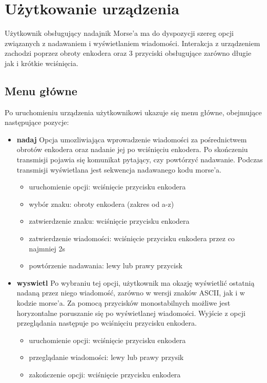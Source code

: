 \documentclass{article}
\begin{document}
\section{Użytkowanie urządzenia}
Użytkownik obsługujący nadajnik Morse'a ma do dyspozycji szereg opcji związanych z nadawaniem i wyświetlaniem wiadomości. Interakcja z urządzeniem zachodzi poprzez obroty enkodera oraz 3 przyciski obsługujące zarówno długie jak i krótkie wciśnięcia.

\subsection{Menu główne}
Po uruchomieniu urządzenia użytkownikowi ukazuje się menu główne, obejmujące następujące pozycje:

\begin{itemize}
	\item	\textbf{nadaj}\newline
Opcja umozliwiająca wprowadzenie wiadomości za pośrednictwem obrotów enkodera oraz nadanie jej po wciśnięciu enkodera. Po skończeniu transmisji pojawia się komunikat pytający, czy powtórzyć nadawanie. Podczas transmisji wyświetlana jest sekwencja nadawanego kodu morse'a.

	\begin{itemize}
	\item uruchomienie opcji: wciśnięcie przycisku enkodera
	\item wybór znaku: obroty enkodera (zakres od a-z)
	\item zatwierdzenie znaku: wciśnięcie przycisku enkodera
	\item zatwierdzenie wiadomości: wciśnięcie przycisku enkodera przez co najmniej 2s
	\item powtórzenie nadawania: lewy lub prawy przycisk
	\end{itemize}

	\item	\textbf{wyswietl}\newline
Po wybraniu tej opcji, użytkownik ma okazję wyświetlić ostatnią nadaną przez niego wiadomość, zarówno w wersji znaków ASCII, jak i w kodzie morse'a. Za pomocą przycisków monostabilnych możliwe jest horyzontalne poruszanie się po wyświetlanej wiadomości. Wyjście z opcji przeglądania następuje po wciśnięciu przycisku enkodera.

	\begin{itemize}
	\item uruchomienie opcji: wciśnięcie przycisku enkodera
	\item przeglądanie wiadomości: lewy lub prawy przysik
	\item zakończenie opcji: wciśnięcie przycisku enkodera
	\end{itemize}


\end{itemize}
\end{document}
